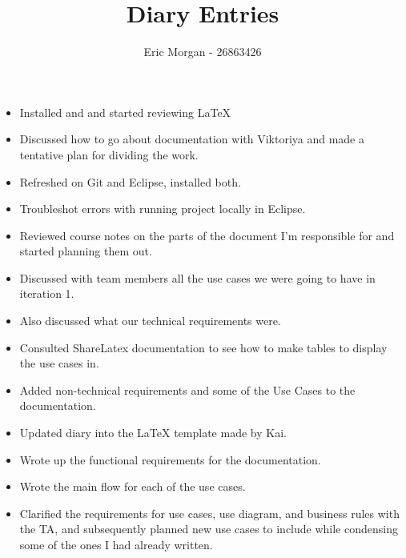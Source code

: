 \documentclass{article}
\title{Diary Entries}
\author{Eric Morgan - 26863426}
\begin{document}
	\maketitle
	
	\begin{itemize}
		\item Installed and and started reviewing LaTeX
	\end{itemize}
	
	\begin{itemize}
		\item Discussed how to go about documentation with Viktoriya and made a 						tentative plan for dividing the work.
	\end{itemize}
	
	\begin{itemize}
		\item Refreshed on Git and Eclipse, installed both.
		\item Troubleshot errors with running project locally in Eclipse.
		\item Reviewed course notes on the parts of the document I'm responsible for and 			started planning them out.
	\end{itemize}
	
	\begin{itemize}
		\item Discussed with team members all the use cases we were going to have in 					iteration 1.
		\item Also discussed what our technical requirements were.
	\end{itemize}
	
	\begin{itemize}
		\item Consulted ShareLatex documentation to see how to make tables to display 					the use cases in.
		\item Added non-technical requirements and some of the Use Cases to the 						documentation.
	\end{itemize}
	
	\begin{itemize}
		\item Updated diary into the LaTeX template made by Kai.
	\end{itemize}
	
	\begin{itemize}
		\item Wrote up the functional requirements for the documentation.
		\item Wrote the main flow for each of the use cases.
		\item Clarified the requirements for use cases, use diagram, and business rules 				with the TA, and subsequently planned new use cases to include while 						condensing some of the ones I had already written.
	\end{itemize}
	
\end{document}
